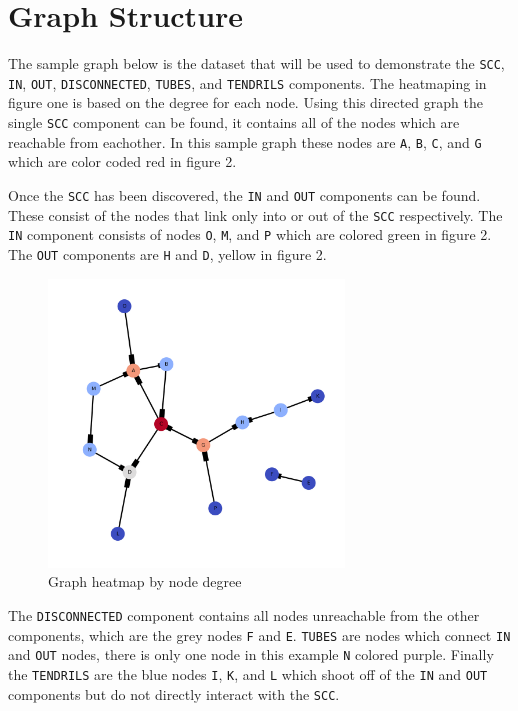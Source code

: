 \documentclass[12pt, a4paper]{article}
\newcommand{\code}[1]{\texttt{#1}}
\begin{document}
\vspace{2em}

\newpage
\section{Graph Structure}

The sample graph below is the dataset that will be used to demonstrate the
\code{SCC}, \code{IN}, \code{OUT}, \code{DISCONNECTED}, \code{TUBES}, and
\code{TENDRILS} components. The heatmaping in figure one is based on the
degree for each node. Using this directed graph the single \code{SCC}
component can be found, it contains all of the nodes which are reachable
from eachother. In this sample graph these nodes are \code{A},
\code{B}, \code{C}, and \code{G} which are color coded red in figure 2.

Once the \code{SCC} has been discovered, the \code{IN} and \code{OUT} components
can be found. These consist of the nodes that link only into or out of the
\code{SCC} respectively. The \code{IN} component consists of nodes
\code{O}, \code{M}, and \code{P} which are colored green in figure 2.
The \code{OUT} components are \code{H} and \code{D}, yellow in figure 2.

\begin{figure}[h]
    \centering
    \caption{Graph heatmap by node degree}
    \includegraphics[width=0.70\textwidth]{dia/graph_heatmap.png}
\end{figure}

The \code{DISCONNECTED} component contains all nodes unreachable from
the other components, which are the grey nodes \code{F} and \code{E}.
\code{TUBES} are nodes which connect \code{IN} and \code{OUT} nodes,
there is only one node in this example \code{N} colored purple.
Finally the \code{TENDRILS} are the blue nodes \code{I}, \code{K},
and \code{L} which shoot off of the \code{IN} and \code{OUT}
components but do not directly interact with the \code{SCC}.
\end{document}
